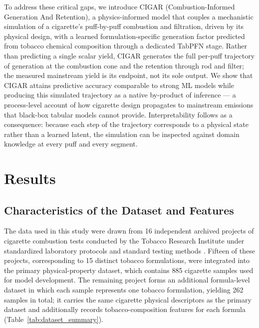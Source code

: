 \documentclass[11pt]{article}
\begin{document}
To address these critical gaps, we introduce CIGAR (Combustion-Informed Generation And Retention), a physics-informed model that couples a mechanistic simulation of a cigarette's puff-by-puff combustion and filtration, driven by its physical design, with a learned formulation-specific generation factor predicted from tobacco chemical composition through a dedicated TabPFN stage. Rather than predicting a single scalar yield, CIGAR generates the full per-puff trajectory of generation at the combustion cone and the retention through rod and filter; the measured mainstream yield is its endpoint, not its sole output. We show that CIGAR attains predictive accuracy comparable to strong ML models while producing this simulated trajectory as a native by-product of inference --- a process-level account of how cigarette design propagates to mainstream emissions that black-box tabular models cannot provide. Interpretability follows as a consequence: because each step of the trajectory corresponds to a physical state rather than a learned latent, the simulation can be inspected against domain knowledge at every puff and every segment.

\section*{Results}

\subsection*{Characteristics of the Dataset and Features}

The data used in this study were drawn from 16 independent archived projects of cigarette combustion tests conducted by the Tobacco Research Institute under standardized laboratory protocols and standard testing methods \cite{gb19609,gb23356,yc253,gb23228,yc377,gb21130,yc255,yc254}. Fifteen of these projects, corresponding to 15 distinct tobacco formulations, were integrated into the primary physical-property dataset, which contains 885 cigarette samples used for model development. The remaining project forms an additional formula-level dataset in which each sample represents one tobacco formulation, yielding 262 samples in total; it carries the same cigarette physical descriptors as the primary dataset and additionally records tobacco-composition features for each formula (Table~\ref{tab:dataset_summary}).
\end{document}
